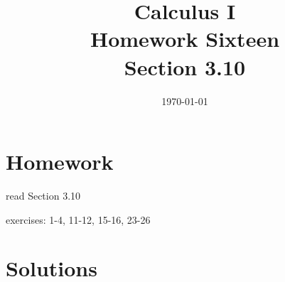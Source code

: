 \documentclass[letterpaper, landscape]{exam}
\title{Calculus I \\ Homework Sixteen \\ Section 3.10}
\author{}
\date{\today}
\begin{document}
  \maketitle

  \section{Homework}
    \begin{itemize*}
      \item read Section 3.10
      \item exercises: 1-4, 11-12, 15-16, 23-26
    \end{itemize*}

  \ifprintanswers

  \section{Solutions}
\end{document}

